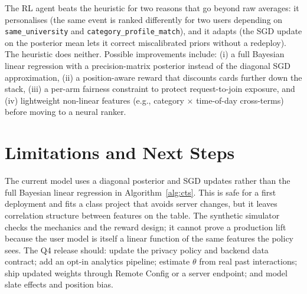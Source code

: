 \documentclass{article}
\begin{document}
The RL agent beats the heuristic for two reasons that go beyond raw averages: it personalises (the same event is ranked differently for two users depending on \texttt{same\_university} and \texttt{category\_profile\_match}), and it adapts (the SGD update on the posterior mean lets it correct miscalibrated priors without a redeploy). The heuristic does neither. Possible improvements include: (i) a full Bayesian linear regression with a precision-matrix posterior instead of the diagonal SGD approximation, (ii) a position-aware reward that discounts cards further down the stack, (iii) a per-arm fairness constraint to protect request-to-join exposure, and (iv) lightweight non-linear features (e.g., category $\times$ time-of-day cross-terms) before moving to a neural ranker.

\section{Limitations and Next Steps}
The current model uses a diagonal posterior and SGD updates rather than the full Bayesian linear regression in Algorithm~\ref{alg:cts}. This is safe for a first deployment and fits a class project that avoids server changes, but it leaves correlation structure between features on the table. The synthetic simulator checks the mechanics and the reward design; it cannot prove a production lift because the user model is itself a linear function of the same features the policy sees. The Q4 release should: update the privacy policy and backend data contract; add an opt-in analytics pipeline; estimate $\theta$ from real past interactions; ship updated weights through Remote Config or a server endpoint; and model slate effects and position bias.



\end{document}
